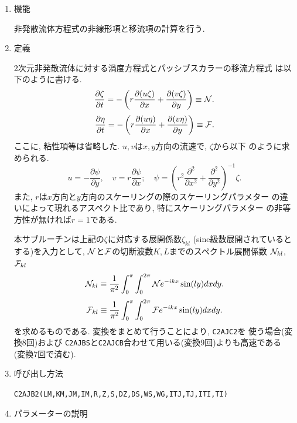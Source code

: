 \documentclass[a4j,fleqn]{jarticle}
\begin{document}
\begin{enumerate}

\item 機能 

非発散流体方程式の非線形項と移流項の計算を行う.

\item 定義

2次元非発散流体に対する渦度方程式とパッシブスカラーの移流方程式
は以下のように書ける.
\[
\frac{\partial\zeta}{\partial t}=
-\left(r\frac{\partial(u\zeta)}{\partial x}
       +\frac{\partial(v\zeta)}{\partial y}\right)
\equiv{\cal N}.
\]
\[
\frac{\partial\eta}{\partial t}=
-\left(r\frac{\partial(u\eta)}{\partial x}
       +\frac{\partial(v\eta)}{\partial y}\right)
\equiv{\cal F}.
\]
ここに, 粘性項等は省略した. $u,v$は$x,y$方向の流速で, $\zeta$から以下
のように求められる.
\[
u=-\frac{\partial\psi}{\partial y},\quad
v=r\frac{\partial\psi}{\partial x}; \quad
\psi=\left(r^2\frac{\partial^2}{\partial x^2}
           +\frac{\partial^2}{\partial y^2}\right)^{-1}\zeta.
\]
また, $r$は$x$方向と$y$方向のスケーリングの際のスケーリングパラメター
の違いによって現れるアスペクト比であり, 特にスケーリングパラメター
の非等方性が無ければ$r=1$である.

本サブルーチンは上記の$\zeta$に対応する展開係数$\zeta_{kl}$
(sine級数展開されているとする)を入力として,
${\cal N}$と${\cal F}$の切断波数$K,L$までのスペクトル展開係数
${\cal N}_{kl}$,${\cal F}_{kl}$
\[
{\cal N}_{kl}\equiv\frac1{\pi^2}\int^{\pi}_0\int^{2\pi}_0
{\cal N}e^{-ikx}\sin(ly)dxdy.
\]
\[
{\cal F}_{kl}\equiv\frac1{\pi^2}\int^{\pi}_0\int^{2\pi}_0
{\cal F}e^{-ikx}\sin(ly)dxdy.
\]
を求めるものである. 変換をまとめて行うことにより, {\tt C2AJC2}を
使う場合(変換8回)および
{\tt C2AJBS}と{\tt C2AJCB}合わせて用いる(変換9回)よりも高速である
(変換7回で済む).

\item 呼び出し方法 

{\tt C2AJB2(LM,KM,JM,IM,R,Z,S,DZ,DS,WS,WG,ITJ,TJ,ITI,TI)}
  
\item パラメーターの説明


\end{enumerate}
\end{document}

